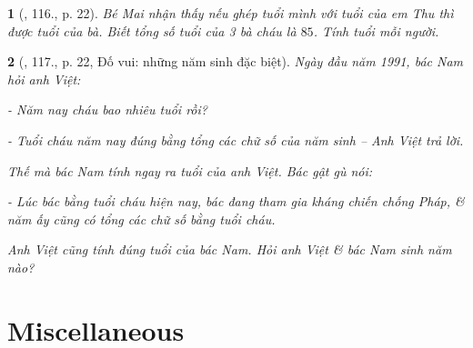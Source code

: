 \documentclass{article}
\newtheorem{baitoan}{}
\begin{document}
\begin{baitoan}[\cite{Binh_Toan_6_tap_1}, 116., p. 22]
	Bé Mai nhận thấy nếu ghép tuổi mình với tuổi của em Thu thì được tuổi của bà. Biết tổng số tuổi của 3 bà cháu là $85$. Tính tuổi mỗi người.
\end{baitoan}

\begin{baitoan}[\cite{Binh_Toan_6_tap_1}, 117., p. 22, Đố vui: những năm sinh đặc biệt]
	Ngày đầu năm 1991, bác Nam hỏi anh Việt:
	
	- Năm nay cháu bao nhiêu tuổi rồi?
	
	- Tuổi cháu năm nay đúng bằng tổng các chữ số của năm sinh -- Anh Việt trả lời.
	
	Thế mà bác Nam tính ngay ra tuổi của anh Việt. Bác gật gù nói:
	
	- Lúc bác bằng tuổi cháu hiện nay, bác đang tham gia kháng chiến chống Pháp, \& năm ấy cũng có tổng các chữ số bằng tuổi cháu.
	
	Anh Việt cũng tính đúng tuổi của bác Nam. Hỏi anh Việt \& bác Nam sinh năm nào?
\end{baitoan}


\section{Miscellaneous}


\printbibliography[heading=bibintoc]
\end{document}

